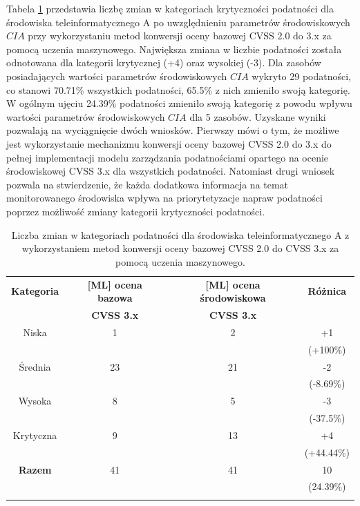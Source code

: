 \bigbreak
Tabela \ref{tab:chapter6:env_a:changes_ml} przedstawia liczbę zmian w kategoriach krytyczności podatności dla środowiska teleinformatycznego A po uwzględnieniu parametrów środowiskowych $CIA$ przy wykorzystaniu metod konwersji oceny bazowej CVSS 2.0 do 3.x za pomocą uczenia maszynowego. Największa zmiana w liczbie podatności została odnotowana dla kategorii krytycznej (+4) oraz wysokiej (-3). Dla zasobów posiadających wartości parametrów środowiskowych $CIA$ wykryto 29 podatności, co stanowi 70.71\% wszystkich podatności, 65.5\% z nich zmieniło swoją kategorię. W ogólnym ujęciu 24.39\% podatności zmieniło swoją kategorię z powodu wpływu wartości parametrów środowiskowych $CIA$ dla 5 zasobów. Uzyskane wyniki pozwalają na wyciągnięcie dwóch wniosków. Pierwszy mówi o tym, że możliwe jest wykorzystanie mechanizmu konwersji oceny bazowej CVSS 2.0 do 3.x do pełnej implementacji modelu zarządzania podatnościami opartego na ocenie środowiskowej CVSS 3.x dla wszystkich podatności. Natomiast drugi wniosek pozwala na stwierdzenie, że każda dodatkowa informacja na temat monitorowanego środowiska wpływa na priorytetyzacje napraw podatności poprzez możliwość zmiany kategorii krytyczności podatności.


\begin{table}[tbh]
\caption{Liczba zmian w kategoriach podatności dla środowiska teleinformatycznego A z wykorzystaniem metod konwersji oceny bazowej CVSS 2.0 do CVSS 3.x za pomocą uczenia maszynowego.}
\begin{center}
\label{tab:chapter6:env_a:changes_ml}
\begin{tabular}{cccc}
\hline \noalign {\smallskip}
\textbf{Kategoria}  & \textbf{[ML] ocena bazowa} & \textbf{[ML] ocena środowiskowa} & \textbf{Różnica} \\
                      & \textbf{CVSS 3.x} & \textbf{CVSS 3.x} & \\
  \hline
  Niska         &      1 &      2  &  +1          \\
                &        &         &  (+100\%)     \\
  Średnia       &     23 &      21 &  -2           \\
                &        &         &  (-8.69\%)       \\
  Wysoka        &      8 &       5 &  -3           \\
                &        &         &  (-37.5\%)   \\
  Krytyczna     &      9 &      13 &  +4          \\
                &        &         &  (+44.44\%)   \\
\hline \noalign {\smallskip}
\textbf{Razem}  &     41 &       41& 10 \\
                &        &         & (24.39\%) \\
\hline \noalign {\smallskip}
\end{tabular}
\end{center}
\end{table}

